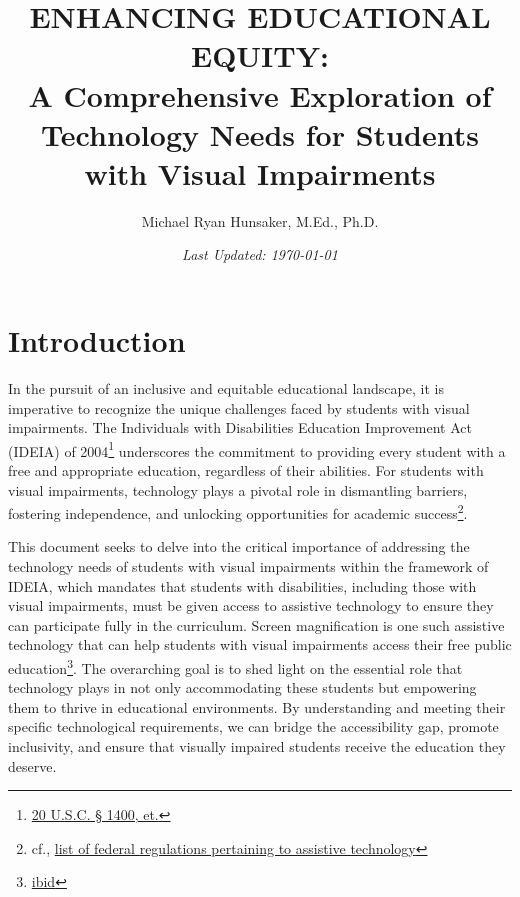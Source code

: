 \documentclass[12pt,letterpaper,twoside]{extreport}
\title{\Huge ENHANCING EDUCATIONAL EQUITY: \\ \Large A Comprehensive Exploration of Technology Needs for Students with Visual Impairments}
\author{Michael Ryan Hunsaker, M.Ed., Ph.D.}
\date{\vfill \textit{Last Updated: {\today}}}
\begin{document}
\maketitle
{}
\setcounter{minitocdepth}{1}
\setcounter{tocdepth}{1}
\cleardoublepage
{}
\tableofcontents
{\listoffigures\let\clearpage\relax\vskip20pt\listoftables}
\newpage{}
\fancyhead{}
\fancyfoot{}
\dominitoc
\hypertarget{intro}{}\chapter*{Introduction}\label{intro}
\pagestyle{fancyplain}
\fancyfoot[C]{\thepage}
In the pursuit of an inclusive and equitable educational landscape, it is imperative to recognize the unique challenges faced by students with visual impairments. The Individuals with Disabilities Education Improvement Act (IDEIA) of 2004\footnote{\href{https://sites.ed.gov/idea/statuteregulations/}{20 U.S.C. § 1400, et.}} underscores the commitment to providing every student with a free and appropriate education, regardless of their abilities. For students with visual impairments, technology plays a pivotal role in dismantling barriers, fostering independence, and unlocking opportunities for academic success\footnote{cf., \href{https://ectacenter.org/topics/atech/laws.asp}{list of federal regulations pertaining to assistive technology}}.

This document seeks to delve into the critical importance of addressing the technology needs of students with visual impairments within the framework of IDEIA, which mandates that students with disabilities, including those with visual impairments, must be given access to assistive technology to ensure they can participate fully in the curriculum. Screen magnification is one such assistive technology that can help students with visual impairments access their free public education\footnote{\href{https://sites.ed.gov/idea/statuteregulations/}{ibid}}. The overarching goal is to shed light on the essential role that technology plays in not only accommodating these students but empowering them to thrive in educational environments. By understanding and meeting their specific technological requirements, we can bridge the accessibility gap, promote inclusivity, and ensure that visually impaired students receive the education they deserve.
\end{document}
